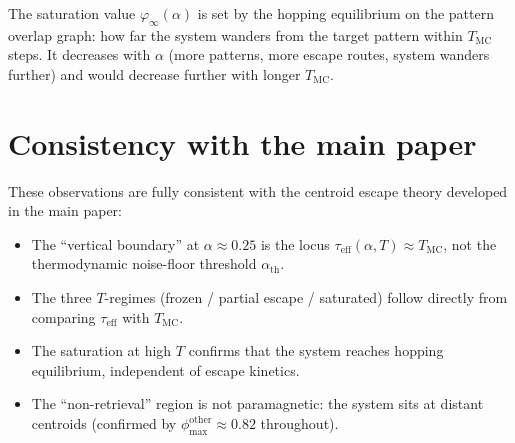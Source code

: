 \documentclass[11pt]{article}
\begin{document}
The saturation value $\varphi_\infty(\alpha)$ is set by the hopping equilibrium on the pattern overlap graph: how far the system wanders from the target pattern within $T_{\mathrm{MC}}$ steps.  It decreases with $\alpha$ (more patterns, more escape routes, system wanders further) and would decrease further with longer $T_{\mathrm{MC}}$.

\section{Consistency with the main paper}

These observations are fully consistent with the centroid escape theory developed in the main paper:
\begin{itemize}
\item The ``vertical boundary'' at $\alpha \approx 0.25$ is the locus $\tau_{\mathrm{eff}}(\alpha, T) \approx T_{\mathrm{MC}}$, not the thermodynamic noise-floor threshold $\alpha_{\mathrm{th}}$.
\item The three $T$-regimes (frozen / partial escape / saturated) follow directly from comparing $\tau_{\mathrm{eff}}$ with $T_{\mathrm{MC}}$.
\item The saturation at high $T$ confirms that the system reaches hopping equilibrium, independent of escape kinetics.
\item The ``non-retrieval'' region is not paramagnetic: the system sits at distant centroids (confirmed by $\phi_{\max}^{\mathrm{other}} \approx 0.82$ throughout).
\end{itemize}
\end{document}
